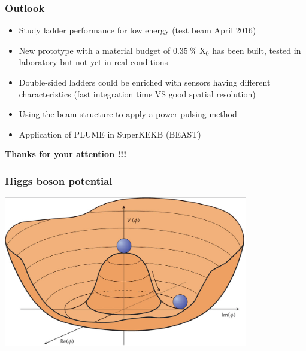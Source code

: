 \documentclass{beamer}
\begin{document}
  \begin{frame}
    \frametitle{Outlook}

    \begin{itemize}
      \item Study ladder performance for low energy (test beam April 2016)
      \item New prototype with a material budget of $0.35~\%$ X$_0$ has been built, tested in laboratory but not yet in real conditions
      \item Double-sided ladders could be enriched with sensors having different characteristics (fast integration time VS good spatial resolution)
      \item Using the beam structure to apply a power-pulsing method
      \item Application of PLUME in SuperKEKB (BEAST)
    \end{itemize}

  \end{frame}

  \begin{frame}
    \begin{center}
      \huge
      \textbf{Thanks for your attention !!!}
    \end{center}
  \end{frame}

  \appendix
  \setcounter{lastframe}{\insertframenumber}

  \begin{frame}[plain]
    \frametitle{Higgs boson potential}

    \begin{center}
      \includegraphics[width = 0.8\textwidth]{Pictures/higgsPotential.png}
    \end{center}
  \end{frame}
\end{document}
